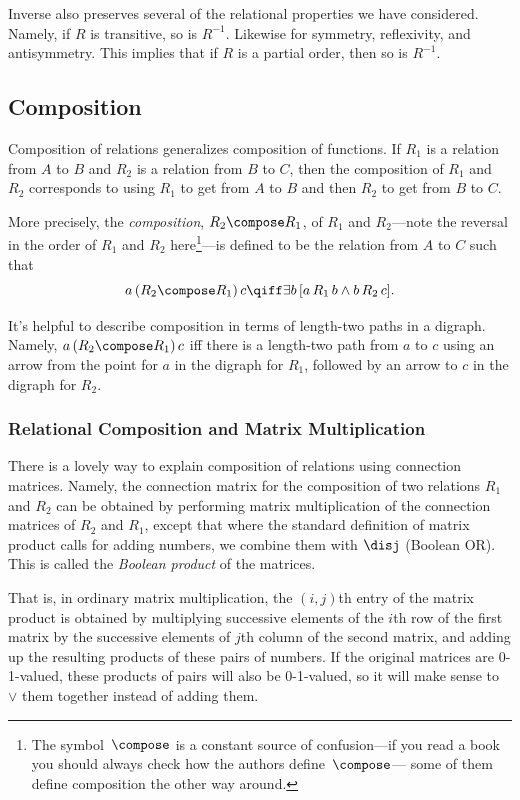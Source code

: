 Inverse also preserves several of the relational properties we have
considered.  Namely, if $R$ is transitive, so is $R^{-1}$.  Likewise for
symmetry, reflexivity, and antisymmetry.  This implies that if $R$ is a
partial order, then so is $R^{-1}$.


\subsection{Composition}

Composition of relations generalizes composition of functions.  If
$R_1$ is a relation from $A$ to $B$ and $R_2$ is a relation from $B$ to
$C$, then the composition of $R_1$ and $R_2$ corresponds to using $R_1$ to
get from $A$ to $B$ and then $R_2$ to get from $B$ to $C$.

More precisely, the \emph{composition}, $R_2 \compose R_1$, of $R_1$ and
$R_2$---note the reversal in the order of $R_1$ and $R_2$
here\footnote{The symbol~$\compose$ is a constant source of confusion---if
you read a book you should always check how the authors define~$\compose$---
some of them define composition the other way around.}---is defined to be
the relation from $A$ to $C$ such that
\begin{displaymath}
a\, (R_2 \compose R_1)\, c  \qiff \exists b\, [a\, R_1\, b \land b\, R_2\, c].
\end{displaymath}

It's helpful to describe composition in terms of length-two paths in a
digraph.  Namely, $a\, (R_2 \compose R_1)\, c$ iff there is a length-two path
from $a$ to $c$ using an arrow from the point for $a$ in the digraph for
$R_1$, followed by an arrow to $c$ in the digraph for $R_2$.


\subsubsection{Relational Composition and Matrix Multiplication}

There is a lovely way to explain composition of relations using connection
matrices.  Namely, the connection matrix for the composition of two
relations $R_1$ and $R_2$ can be obtained by performing matrix
multiplication of the connection matrices of $R_2$ and $R_1$, except that
where the standard definition of matrix product calls for adding numbers,
we combine them with $\disj$ (Boolean OR).  This is called the \emph{Boolean
product} of the matrices.

That is, in ordinary matrix multiplication, the $(i,j)$th entry of the
matrix product is obtained by multiplying successive elements of the $i$th
row of the first matrix by the successive elements of $j$th column of the
second matrix, and adding up the resulting products of these pairs of
numbers.  If the original matrices are 0-1-valued, these products of
pairs will also be 0-1-valued, so it will make sense to $\lor$ them
together instead of adding them.

